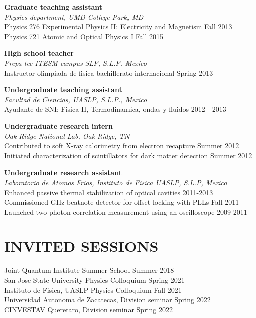 \documentclass[margin]{res} %
\begin{document}
\begin{resume}
{\bf Graduate teaching assistant} \\
{\it Physics department, UMD College Park, MD}\\
{Physics 276 Experimental Physics II: Electricity and Magnetism} \hfill Fall 2013\\
{Physics 721 Atomic and Optical Physics I} \hfill Fall 2015

{\bf High school teacher} \\
{\it Prepa-tec ITESM campus SLP, S.L.P. Mexico}\\ 
{Instructor olimpiada de fisica bachillerato internacional} \hfill Spring 2013

{\bf Undergraduate teaching assistant} \\
{\it Facultad de Ciencias, UASLP, S.L.P., Mexico}\\
{Ayudante de SNI: Fisica II, Termodinamica, ondas y fluidos} \hfill 2012 - 2013

{\bf Undergraduate research intern} \\
{\it Oak Ridge National Lab, Oak Ridge, TN}\\
{Contributed to soft X-ray calorimetry from electron recapture} \hfill Summer 2012\\
{Initiated characterization of scintillators for dark matter detection} \hfill Summer 2012

{\bf Undergraduate research assistant} \\
{\it Laboratorio de Atomos Frios, Instituto de Fisica UASLP, S.L.P, Mexico}\\
{Enhanced passive thermal stabilization of optical cavities} \hfill 2011-2013\\
{Commissioned GHz beatnote detector for offset locking with PLLs} \hfill Fall 2011 \\
{Launched two-photon correlation measurement using an oscilloscope} \hfill 2009-2011

\section{INVITED SESSIONS}
{Joint Quantum Institute Summer School \hfill Summer 2018}\\
{San Jose State University Physics Colloquium \hfill Spring 2021}\\
{Instituto de Fisica, UASLP Physics Colloquium \hfill Fall 2021}\\
{Universidad Autonoma de Zacatecas, Division seminar \hfill Spring 2022}\\
{CINVESTAV Queretaro, Division seminar \hfill Spring 2022}


\end{resume}
\end{document}
